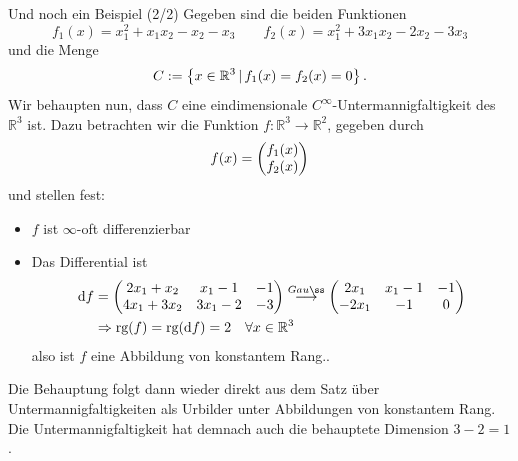 \begin{Beispiel}
    {Und noch ein Beispiel (2/2)}
    Gegeben sind die beiden Funktionen
    \begin{equation*}
        f_1(x)=x_1^2+x_1x_2-x_2-x_3 \qquad f_2(x)=x_1^2+3x_1x_2-2x_2-3x_3
    \end{equation*}
    und die Menge
    \begin{equation*}
        C:=\left\{x\in\mathbb{R}^3\,|\, f_1(x)=f_2(x)=0\right\}.
    \end{equation*}
    Wir behaupten nun, dass $C$ eine eindimensionale $C^{\infty}$-Untermannigfaltigkeit des $\mathbb{R}^3$ ist. Dazu betrachten wir die Funktion $f:\mathbb{R}^3\rightarrow\mathbb{R}^2$, gegeben durch
    \begin{equation*}
        f(x)=\begin{pmatrix}f_1(x) \\ f_2(x)\end{pmatrix}
    \end{equation*}
    und stellen fest:
    \begin{itemize}
        \item $f$ ist $\infty$-oft differenzierbar
        \item Das Differential ist
        \begin{align*}
            \text{d}f&=\Matrix{2x_1+x_2 & x_1-1 & -1 \\ 4x_1+3x_2 & 3x_1-2 & -3} \overset{Gauß}{\longrightarrow} \Matrix{2x_1 & x_1-1 & -1 \\ -2x_1 & -1 & 0} \\
            &\Rightarrow \text{rg}(f)=\text{rg}(\text{d}f)=2 \quad \forall x\in\mathbb{R}^3
        \end{align*}
        also ist $f$ eine Abbildung von konstantem Rang..
    \end{itemize}
    Die Behauptung folgt dann wieder direkt aus dem Satz über Untermannigfaltigkeiten als Urbilder unter Abbildungen von konstantem Rang. Die Untermannigfaltigkeit hat demnach auch die behauptete Dimension $3-2=1$.
\end{Beispiel}


